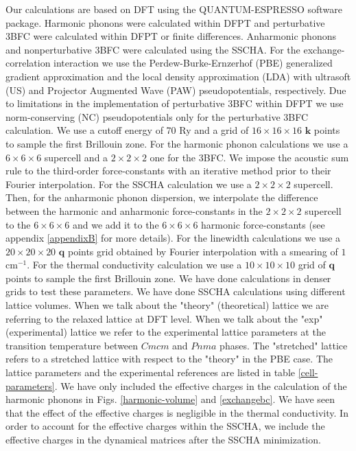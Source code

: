 Our calculations are based on DFT using the QUANTUM-ESPRESSO\cite{giannozzi2009quantum} software package. Harmonic phonons were calculated within DFPT and perturbative 3BFC were calculated within DFPT or finite 
differences\cite{li2014shengbte}. Anharmonic phonons and nonperturbative 3BFC were calculated using the SSCHA. For the exchange-correlation interaction we use the Perdew-Burke-Ernzerhof (PBE) generalized gradient 
approximation and the local density approximation (LDA) with ultrasoft (US) and Projector Augmented Wave (PAW) pseudopotentials, respectively. Due to limitations in the implementation of perturbative 3BFC 
within DFPT we use norm-conserving (NC) pseudopotentials only for the perturbative 3BFC calculation. We use a cutoff 
energy of 70 Ry and a grid of $16\times16\times16$ $\boldsymbol{k}$ points to sample the first Brillouin zone. For 
the harmonic phonon calculations we use a $6\times6\times6$ supercell and a $2\times2\times2$ one for the 3BFC. 
We impose the acoustic sum rule to the third-order force-constants with an iterative method prior to their Fourier
interpolation\cite{paulatto2013anharmonic,aseginolaza2019phonon}. For the SSCHA calculation we use a 
$2\times2\times2$ supercell. Then, for the anharmonic phonon dispersion, we 
interpolate the difference between the harmonic and anharmonic force-constants in the $2\times2\times2$ supercell to 
the $6\times6\times6$ and we add it to the $6\times6\times6$ harmonic force-constants (see appendix \ref{appendixB} 
for more details). For the linewidth calculations we use a $20\times20\times20$ $\boldsymbol{q}$ points grid 
obtained by Fourier interpolation with a smearing of $1$ cm$^{-1}$. For the thermal conductivity calculation we use 
a $10\times10\times10$ grid of $\boldsymbol{q}$ points to sample the first Brillouin zone. We have done calculations 
in denser grids to test these parameters. We have done SSCHA calculations using different lattice volumes. When we talk about the "theory" (theoretical) lattice we are referring to the relaxed lattice at DFT level. When we talk about the "exp" (experimental) lattice we refer to the experimental lattice parameters at the transition temperature between $Cmcm$ and $Pnma$ phases. The "stretched" lattice refers to a stretched lattice with respect to the "theory" in the PBE case. The lattice parameters and the experimental references are listed in table \ref{cell-parameters}. We have 
only included the effective charges in the calculation of the harmonic phonons in Figs. \ref{harmonic-volume} and 
\ref{exchangebc}. We have seen that the effect of the effective charges is negligible in the thermal conductivity. 
In order to account for the effective charges within the SSCHA, we include the effective charges in the dynamical 
matrices after the SSCHA minimization.

